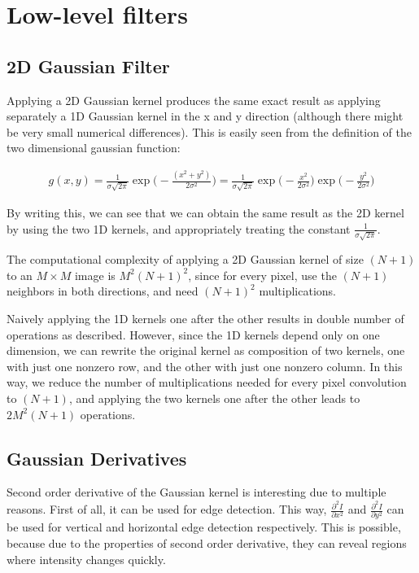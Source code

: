 \documentclass{article}
\begin{document}
\section{Low-level filters}
\subsection{2D Gaussian Filter}

Applying a 2D Gaussian kernel produces the same exact result as applying separately a 1D Gaussian kernel in the x and y direction (although there might be very small numerical differences). This is easily seen from the definition of the two dimensional gaussian function:

\begin{align*}
    g (x,y) = \frac{1}{\sigma \sqrt{2 \pi}} \exp \big(- \frac{(x^2 + y^2)}{2\sigma^2} \big) = \frac{1}{\sigma \sqrt{2 \pi}} \exp \big(- \frac{x^2}{2\sigma^2} \big) \exp \big(- \frac{y^2}{2\sigma^2} \big)
\end{align*}

By writing this, we can see that we can obtain the same result as the 2D kernel by using the two 1D kernels, and appropriately treating the constant $\frac{1}{\sigma \sqrt{2 \pi}}$.

The computational complexity of applying a 2D Gaussian kernel of size $(N+1)$ to an $M \times M$ image is $M^2(N+1)^2$, since for every pixel, use the $(N+1)$ neighbors in both directions, and need $(N+1)^2$ multiplications.

Naively applying the 1D kernels one after the other results in double number of operations as described. However, since the 1D kernels depend only on one dimension, we can rewrite the original kernel as composition of two kernels, one with just one nonzero row, and the other with just one nonzero column. In this way, we reduce the number of multiplications needed for every pixel convolution to $(N+1)$, and applying the two kernels one after the other leads to $2M^2(N+1)$ operations.

\subsection{Gaussian Derivatives}

Second order derivative of the Gaussian kernel is interesting due to multiple reasons. First of all, it can be used for edge detection. This way, $\frac{\partial^2 I}{\partial x^2}$ and $\frac{\partial^2 I}{\partial y^2}$ can be used for vertical and horizontal edge detection respectively. This is possible, because due to the properties of second order derivative, they can reveal regions where intensity changes quickly. 
\end{document}
